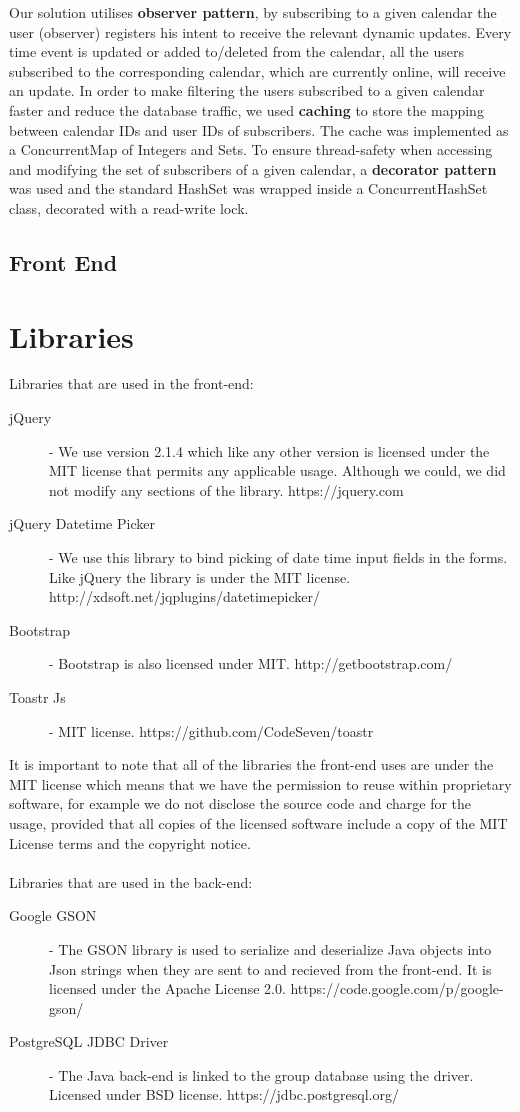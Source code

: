 \documentclass[10pt,a4paper]{article}
\begin{document}
Our solution utilises \textbf{observer pattern}, by subscribing to a given calendar the user (observer) registers his intent to receive the relevant dynamic updates. Every time event is updated 
or added to/deleted from the calendar, all the users subscribed to the corresponding calendar, which are currently online, will receive an update. In order to make filtering the users
subscribed to a given calendar faster and reduce the database traffic, we used \textbf{caching} to store the mapping between calendar IDs and user IDs of subscribers. The cache was implemented
as a ConcurrentMap of Integers and Sets. To ensure thread-safety when accessing and modifying the set of subscribers of a given calendar, a \textbf{decorator pattern} was used and the standard
HashSet was wrapped inside a ConcurrentHashSet class, decorated with a read-write lock.

\subsection{Front End}

\section{Libraries}
Libraries that are used in the front-end:
\begin{description}
\item[jQuery] - We use version 2.1.4 which like any other version is licensed under the MIT license that permits any applicable usage. Although we could, we did not modify any sections of the library. https://jquery.com
\item[jQuery Datetime Picker] - We use this library to bind picking of date time input fields in the forms. Like jQuery the library is under the MIT license. http://xdsoft.net/jqplugins/datetimepicker/
\item[Bootstrap] - Bootstrap is also licensed under MIT. http://getbootstrap.com/
\item[Toastr Js] - MIT license. https://github.com/CodeSeven/toastr
\end{description}
It is important to note that all of the libraries the front-end uses are under the MIT license which means that we have the permission to reuse within proprietary software, for example we do not disclose the source code and charge for the usage, provided that all copies of the licensed software include a copy of the MIT License terms and the copyright notice. \\ \\
Libraries that are used in the back-end:
\begin{description}
\item[Google GSON] - The GSON library is used to serialize and deserialize Java objects into Json strings when they are sent to and recieved from the front-end. It is licensed under the Apache License 2.0. https://code.google.com/p/google-gson/
\item[PostgreSQL JDBC Driver] - The Java back-end is linked to the group database using the driver. Licensed under BSD license. https://jdbc.postgresql.org/
\end{description}
     
\end{document}
